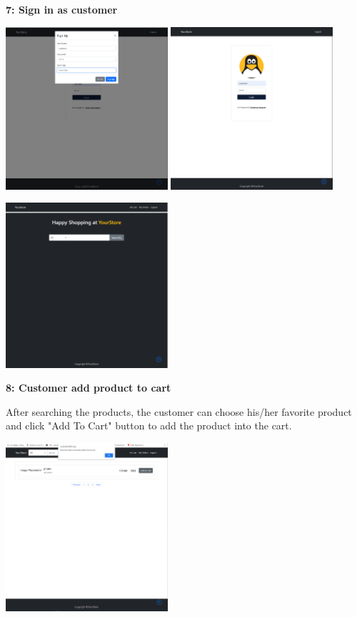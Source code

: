 \documentclass[12pt]{article}
\begin{document}
\newpage
\textbf{7: Sign in as customer}

\includegraphics[width=0.45\textwidth]{UserGuideImage/12.png}
\includegraphics[width=0.45\textwidth]{UserGuideImage/13.png}

\includegraphics[width=0.45\textwidth]{UserGuideImage/14.png}

\newpage
\textbf{8: Customer add product to cart}

After searching the products, the customer can choose his/her favorite product and click "Add To Cart" button
to add the product into the cart.

\includegraphics[width=0.45\textwidth]{UserGuideImage/15.png}
\end{document}
